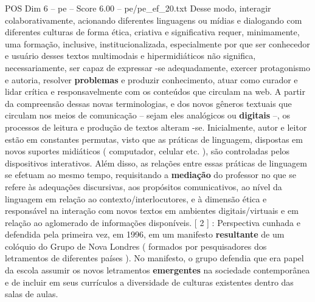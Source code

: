 \begin{textsample}{POS Dim 6 – pe – Score 6.00 – pe/pe\_ef\_20.txt}
Desse modo, interagir colaborativamente, acionando diferentes linguagens ou mídias e dialogando com diferentes culturas de forma ética, criativa e significativa requer, minimamente, uma formação, inclusive, institucionalizada, especialmente por que ser conhecedor e usuário desses textos multimodais e hipermidiáticos não significa, necessariamente, ser capaz de expressar -se adequadamente, exercer protagonismo e autoria, resolver \textbf{problemas} e produzir conhecimento, atuar como curador e lidar crítica e responsavelmente com os conteúdos que circulam na web.
A partir da compreensão dessas novas terminologias, e dos novos gêneros textuais que circulam nos meios de comunicação – sejam eles analógicos ou \textbf{digitais} –, os processos de leitura e produção de textos alteram -se.
Inicialmente, autor e leitor estão em constantes permutas, visto que as práticas de linguagem, dispostas em novos suportes midiáticos ( computador, celular etc. ), são controladas pelos dispositivos interativos.
Além disso, as relações entre essas práticas de linguagem se efetuam ao mesmo tempo, requisitando a \textbf{mediação} do professor no que se refere às adequações discursivas, aos propósitos comunicativos, ao nível da linguagem em relação ao contexto/interlocutores, e à dimensão ética e responsável na interação com novos textos em ambientes digitais/virtuais e em relação ao aglomerado de informações disponíveis. [ 2 ] : Perspectiva cunhada e defendida pela primeira vez, em 1996, em um manifesto \textbf{resultante} de um colóquio do Grupo de Nova Londres ( formados por pesquisadores dos letramentos de diferentes países ).
No manifesto, o grupo defendia que era papel da escola assumir os novos letramentos \textbf{emergentes} na sociedade contemporânea e de incluir em seus currículos a diversidade de culturas existentes dentro das salas de aulas.

\end{textsample}
